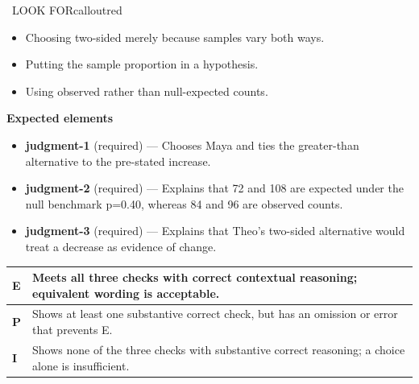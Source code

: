 \documentclass[11pt]{article}
\begin{document}
\begin{callout}{\IconWarn\ LOOK FOR}{calloutred}
\begin{itemize}[leftmargin=1.5em,itemsep=2pt,topsep=2pt]
  \item Choosing two-sided merely because samples vary both ways.
  \item Putting the sample proportion in a hypothesis.
  \item Using observed rather than null-expected counts.
\end{itemize}
\end{callout}


\textbf{Expected elements}
\begin{itemize}[leftmargin=1.5em,itemsep=2pt,topsep=2pt]
  \item \textbf{judgment-1} (required) --- Chooses Maya and ties the greater-than alternative to the pre-stated increase.
  \item \textbf{judgment-2} (required) --- Explains that 72 and 108 are expected under the null benchmark p=0.40, whereas 84 and 96 are observed counts.
  \item \textbf{judgment-3} (required) --- Explains that Theo's two-sided alternative would treat a decrease as evidence of change.
\end{itemize}

{\small\renewcommand{\arraystretch}{1.25}
\noindent\begin{tabular}{|p{0.5in}|p{5.9in}|}
\hline
\textbf{E} & Meets all three checks with correct contextual reasoning; equivalent wording is acceptable. \\ \hline
\textbf{P} & Shows at least one substantive correct check, but has an omission or error that prevents E. \\ \hline
\textbf{I} & Shows none of the three checks with substantive correct reasoning; a choice alone is insufficient. \\ \hline
\end{tabular}}

\clearpage
{}
\end{document}
